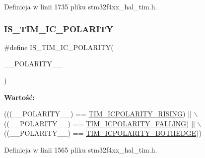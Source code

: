 Definicja w linii 1735 pliku stm32f4xx\+\_\+hal\+\_\+tim.\+h.

\mbox{\label{group___t_i_m___private___macros_ga346707dd1b0915436ca3f58dcfbef3d5}} 
\subsubsection{\texorpdfstring{I\+S\+\_\+\+T\+I\+M\+\_\+\+I\+C\+\_\+\+P\+O\+L\+A\+R\+I\+TY}{IS\_TIM\_IC\_POLARITY}}
{\footnotesize\ttfamily \#define I\+S\+\_\+\+T\+I\+M\+\_\+\+I\+C\+\_\+\+P\+O\+L\+A\+R\+I\+TY(\begin{DoxyParamCaption}\item[{}]{\+\_\+\+\_\+\+P\+O\+L\+A\+R\+I\+T\+Y\+\_\+\+\_\+ }\end{DoxyParamCaption})}

{\bfseries Wartość\+:}
\begin{DoxyCode}
(((\_\_POLARITY\_\_) == \hyperlink{group___t_i_m___input___capture___polarity_gac79dd2a7ba97e5aac0bb9cbdc2d02ee1}{TIM\_ICPOLARITY\_RISING})   || \(\backslash\)
                                            ((\_\_POLARITY\_\_) == 
      \hyperlink{group___t_i_m___input___capture___polarity_gaec0c00d0b749e8c18101cefcce7c32f6}{TIM\_ICPOLARITY\_FALLING})  || \(\backslash\)
                                            ((\_\_POLARITY\_\_) == 
      \hyperlink{group___t_i_m___input___capture___polarity_ga7a340c94a7bd0fa4a915afa8788e0b71}{TIM\_ICPOLARITY\_BOTHEDGE}))
\end{DoxyCode}


Definicja w linii 1565 pliku stm32f4xx\+\_\+hal\+\_\+tim.\+h.

\mbox{\label{group___t_i_m___private___macros_ga86558ff4924a0526ce7593db238a17ab}} 
